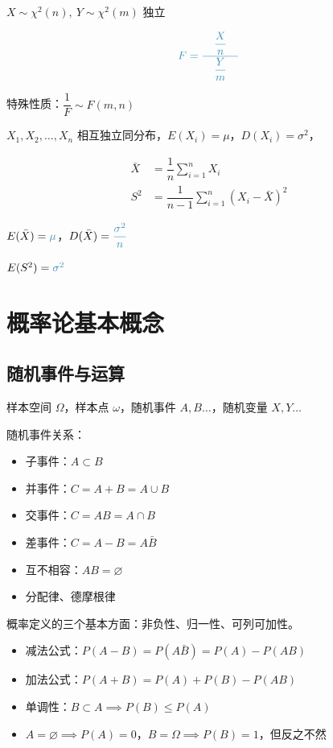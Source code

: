 \documentclass[UTF8]{ctexart}
\newcommand\means[1]{\textcolor{cyan!70!black}{#1}}
\begin{document}
\begin{tcbitemize}[raster columns=2, raster equal height=rows, colframe=cyan!75!black, colback=cyan!5!white, fonttitle=\bfseries]
\tcbitem[squeezed title={$\boldsymbol{F}$ 分布—— $F\sim F(n,m)$}]
$X\sim \chi^2(n), \ Y\sim \chi^2(m)$ 独立

\[\means{F=\dfrac{\quad \dfrac{X}{n}\quad }{\dfrac{Y}{m}}}\]

特殊性质：$\dfrac1F\sim F(m,n)$

\tcbitem[squeezed title={「实例12」}]
$X_1,X_2,\dots,X_n$ 相互独立同分布，$E(X_i)=\mu$，$D(X_i)=\sigma^2$，

\begin{equation*}
\begin{aligned}
   \bar{X} &=\dfrac1n\sum\limits_{i=1}^n X_i \\
   S^2 &=\dfrac1{n-1}\sum\limits_{i=1}^n (X_i-\bar{X})^2
\end{aligned}
\end{equation*}

$E(\bar{X}) = \means{\mu}$，$D(\bar{X}) = \means{\dfrac{\sigma^2}{n}}$

$E(S^2) = \means{\sigma^2}$

\end{tcbitemize}

\section{概率论基本概念}
\subsection{随机事件与运算}
样本空间 $\varOmega$，样本点 $\omega$，随机事件 $A,B\dots$，随机变量 $X,Y\dots$

随机事件关系：
\begin{itemize}[itemsep=0pt,parsep=0pt]
  \item 子事件：$A\subset B$
  \item 并事件：$C=A+B=A\cup B$
  \item 交事件：$C=AB=A\cap B$
  \item 差事件：$C=A-B = A\bar{B}$
  \item 互不相容：$AB=\varnothing$
  \item 分配律、德摩根律
\end{itemize}

概率定义的三个基本方面：非负性、归一性、可列可加性。
\begin{itemize}
  \item 减法公式：$P(A-B) = P(A\bar{B}) = P(A) - P(AB)$
  \item 加法公式：$P(A+B) = P(A) + P(B) - P(AB)$
  \item 单调性：$B\subset A \implies P(B)\leqslant P(A)$
  \item $A=\varnothing\implies P(A)=0$，$B=\varOmega\implies P(B)=1$，但反之不然
\end{itemize}
\end{document}
